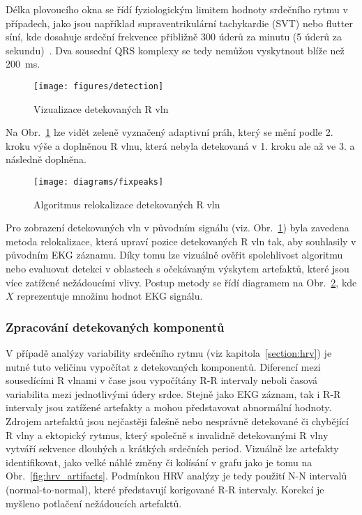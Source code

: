 Délka plovoucího okna se řídí fyziologickým limitem hodnoty srdečního rytmu v
případech, jako jsou například supraventrikulární tachykardie (SVT) nebo flutter
síní, kde dosahuje srdeční frekvence přibližně 300 úderů za minutu (5 úderů za
sekundu)~\cite{Haberl2012,Goldberger2017}. Dva sousední QRS komplexy se tedy
nemůžou vyskytnout blíže než 200~\si\ms.

\begin{figure}[h]
    \begin{center}
        \texttt{[image: figures/detection]}
        \caption{Vizualizace detekovaných R vln}
        \label{fig:detection}
    \end{center}
\end{figure}

Na Obr.~\ref{fig:detection} lze vidět zeleně vyznačený
adaptivní práh, který se mění podle 2. kroku výše a doplněnou R vlnu, která
nebyla detekovaná v 1. kroku ale až ve 3. a následně doplněna.

\begin{figure}[H]
    \begin{center}
        \texttt{[image: diagrams/fixpeaks]}
        \caption{Algoritmus relokalizace detekovaných R vln}
        \label{fig:fixpeaks}
    \end{center}
\end{figure}

Pro zobrazení detekovaných vln v původním signálu (viz. Obr.~\ref{fig:detection})
byla zavedena metoda relokalizace, která upraví pozice
detekovaných R vln tak, aby souhlasily v původním EKG záznamu. Díky tomu lze
vizuálně ověřit spolehlivost algoritmu nebo evaluovat detekci v oblastech s očekávaným
výskytem artefaktů, které jsou více zatížené nežádoucími vlivy. Postup metody se řídí
diagramem na Obr.~\ref{fig:fixpeaks}, kde $X$ reprezentuje množinu hodnot EKG
signálu.

\subsubsection{Zpracování detekovaných komponentů}
\label{section:components_processing}
V případě analýzy variability srdečního rytmu (viz kapitola~\ref{section:hrv})
je nutné tuto veličinu vypočítat z detekovaných komponentů. Diferencí mezi
sousedícími R vlnami v čase jsou vypočítány R-R intervaly neboli časová
variabilita mezi jednotlivými údery srdce. Stejně jako EKG záznam, tak i R-R
intervaly jsou zatížené artefakty a mohou představovat abnormální hodnoty.
Zdrojem artefaktů jsou nejčastěji falešně nebo nesprávně detekované či chybějící
R vlny a ektopický rytmus, který společně s invalidně detekovanými R vlny
vytváří sekvence dlouhých a krátkých srdečních period. Vizuálně lze artefakty
identifikovat, jako velké náhlé změny či kolísání v grafu jako je tomu na
Obr.~\ref{fig:hrv_artifacts}. Podmínkou HRV analýzy je tedy použití N-N
intervalů (normal-to-normal), které představují korigované R-R intervaly.
Korekcí je myšleno potlačení nežádoucích artefaktů.


